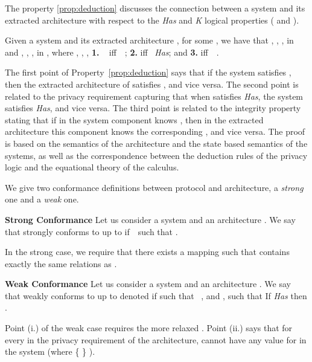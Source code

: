 \documentclass{llncs}
\begin{document}
The property \ref{prop:deduction} discusses the connection between a system  and 
its extracted architecture  with respect to the \textit{Has} 
and \textit{K} logical properties ( and ). 

\begin{ttp}
\label{prop:deduction} 
Given a system  and its extracted architecture , 
for some ,  
we have that  , , ,  in  and  , , 
,   in , where   ,   , 
  ,        
\textbf{1.} \mbox{  } iff\ \  
  ; \textbf{2.} 
   iff \mbox{  \textit{Has}}; and  
\textbf{3.}    iff\ \  
  . 
\end{ttp} 

The first point of Property~\ref{prop:deduction} says that if the system  satisfies 
, then the extracted architecture  
of  satisfies , and vice versa. The second point is related 
to the privacy requirement capturing that when  satisfies 
\textit{Has}, the system  satisfies \textit{Has}, and 
vice versa. The third point is related to the integrity property stating that if in the system  component 
 knows   , then in the extracted architecture this component knows the corresponding 
  , and vice versa.  The proof is based on the semantics of the architecture and the state based 
semantics of the systems, as well as the correspondence between the deduction rules 
of the privacy logic and the equational theory  of the calculus.  
 
We give two conformance definitions 
between protocol and architecture, a \textit{strong} one and a \textit{weak} one.     
                          
\begin{ttd}
\label{def:satstr}
\textbf{Strong Conformance} Let us consider a system  and an architecture . 
We say that  strongly conforms to  up to     if\ \mbox{  such} that 
  .   
\end{ttd} 

In the strong case, we require that there exists a mapping  such that  
contains exactly the same relations as . 

\begin{ttd}
\label{def:satweak}
\textbf{Weak Conformance} Let us consider a system  and an architecture . 
We say that  weakly conforms to  up to  denoted   
 if    such that \mbox{  }, and   ,  such that  
    If   
\textit{Has} then   
.   
\end{ttd} 

Point (i.) of the weak case requires the more relaxed   . 
Point (ii.) says that for every  in the privacy requirement  
of the architecture,  cannot have any value  for  in the system  (where \{  \}  
).  
\end{document}
